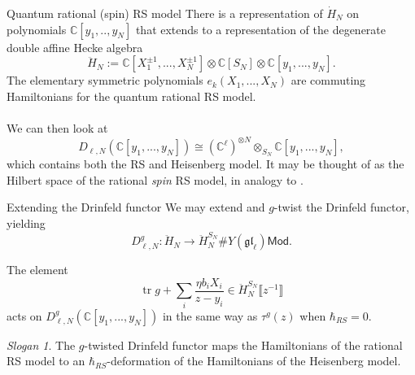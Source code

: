 \documentclass[11pt]{beamer}
\theoremstyle{remark}
\theoremstyle{remark}
\newtheorem*{slogan}{Slogan}
\newcommand{\C}{\mathbb{C}}
\begin{document}
\begin{frame}{Quantum rational (spin) RS model}
There is a representation of $\dot H_N$ on polynomials $\C[y_1,..,y_N]$ that extends to a representation of the degenerate double affine Hecke algebra
\begin{equation*}
\ddot H_N := \C[X_1^{\pm 1},...,X_N^{\pm 1}] \otimes \C[S_N] \otimes \C[y_1,...,y_N].
\end{equation*}
The elementary symmetric polynomials $e_k(X_1,...,X_N)$ are commuting Hamiltonians for the quantum rational RS model.
\\~\\
We can then look at
\begin{equation*}
D_{\ell,N}(\C[y_1,...,y_N]) \cong (\C^\ell)^{\otimes N} \otimes_{S_N} \C[y_1,...,y_N],
\end{equation*}
which contains both the RS and Heisenberg model. It may be thought of as the Hilbert space of the rational \emph{spin} RS model, in analogy to \cite{article:lamers:2022}.
\end{frame}

\begin{frame}{Extending the Drinfeld functor}
We may extend and $g$-twist the Drinfeld functor, yielding
\begin{equation*}
D_{\ell,N}^g: \ddot H_N \to \ddot H_N^{S_N} \# Y(\mathfrak{gl}_\ell)\mathsf{Mod}.
\end{equation*}

\begin{theorem}
The element
\begin{equation*}
\operatorname{tr} g + \sum_i \frac{\eta b_i X_i}{z-y_i} \in \ddot H_N^{S_N}\llbracket z^{-1} \rrbracket
\end{equation*}
acts on $D_{\ell,N}^g(\C[y_1,...,y_N])$ in the same way as $\tau^g(z)$ when $\hbar_{RS} = 0$.
\end{theorem}

\begin{slogan}
The $g$-twisted Drinfeld functor maps the Hamiltonians of the rational RS model to an $\hbar_{RS}$-deformation of the Hamiltonians of the Heisenberg model.
\end{slogan}
\end{frame}
\end{document}
